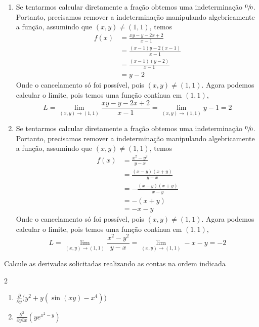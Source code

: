 \documentclass[a4paper,12pt,fleqn]{article}
\newcommand{\D}[2]{\frac{\partial {#1}}{\partial {#2}}}
\newcommand{\DM}[3]{\frac{\partial^2 {#1}}{\partial {#2} \partial {#3}}}
\begin{document}
\begin{answer}
\begin{enumerate}
  \item[a)]
  Se tentarmos calcular diretamente a fração obtemos uma
  indeterminação $\sfrac{0}{0}$.
  Portanto, precisamos remover a indeterminação manipulando
  algebricamente a função,
  assumindo que $(x, y)\neq(1, 1)$, temos
  \begin{align*}
    f(x) & = \frac{xy - y -2x + 2}{x-1} \\[2mm]
         & = \frac{(x - 1)y -2(x - 1)}{x-1} \\[2mm]
         & = \frac{(x - 1)(y -2)}{x-1} \\
         & = y - 2
  \end{align*}
  Onde o cancelamento só foi possível, pois $(x, y)\neq(1, 1)$.
  Agora podemos calcular o limite, pois temos uma função contínua em $(1, 1)$,
  \[
    L
    = \lim_{(x, y)\to(1, 1)} \frac{xy - y -2x + 2}{x-1}
    = \lim_{(x, y)\to(1, 1)} y - 1 = 2
  \]

  \item[b)]
  Se tentarmos calcular diretamente a fração obtemos uma
  indeterminação $\sfrac{0}{0}$.
  Portanto, precisamos remover a indeterminação manipulando
  algebricamente a função,
  assumindo que $(x, y)\neq(1, 1)$, temos
  \begin{align*}
    f(x) & = \frac{x^2 - y^2}{y-x}  \\[2mm]
         & = \frac{(x-y)(x+y)}{y-x} \\[2mm]
         & = -\frac{(x-y)(x+y)}{x-y} \\[2mm]
         & = -(x+y) \\[2mm]
         & = -x-y
  \end{align*}
  Onde o cancelamento só foi possível, pois $(x, y)\neq(1, 1)$.
  Agora podemos calcular o limite, pois temos uma função contínua em $(1, 1)$,
  \[
    L
    = \lim_{(x, y)\to(1, 1)} \frac{x^2 - y^2}{y-x}
    = \lim_{(x, y)\to(1, 1)} -x-y = -2
  \]
\end{enumerate}
\clearpage
\end{answer}

Calcule as derivadas solicitadas realizando as contas na ordem indicada
\begin{multicols}{2}
\begin{enumerate}
  \item[{a) [15]}] \(\D{}{y}     \Big(y^2 + y\left(\sin(xy)-x^4\right)\Big)  \)
  \item[{b) [15]}] \(\DM{}{y}{x} \left(y e^{x^2 - y}\right)\)
\end{enumerate}
\end{multicols}
\end{document}
